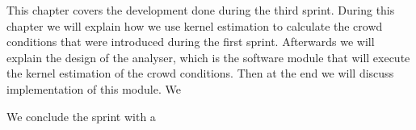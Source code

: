 This chapter covers the development done during the third sprint. During this chapter we will explain how we use kernel estimation to calculate the crowd conditions that were introduced during the first sprint. Afterwards we will explain the design of the analyser, which is the software module that will execute the kernel estimation of the crowd conditions. Then at the end we will discuss implementation of this module. We

We conclude the sprint with a 